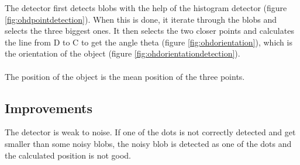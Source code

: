     The detector first detects blobs with the help of the histogram 
    detector (figure \ref{fig:ohdpointdetection}). When this is done, it 
    iterate through the blobs and selects 
    the three biggest ones.  It then selects the two closer points and 
    calculates the line from D to C to get the angle theta (figure
    \ref{fig:ohdorientation}), which is the 
    orientation of the object (figure \ref{fig:ohdorientationdetection}).
    \\
    \\
    The position of the object is the mean position of the three points.

\subsection{Improvements}
\label{sec:ohd:improvments}

    The detector is weak to noise. If one of the dots is not correctly 
    detected and get smaller than some noisy blobs, the noisy blob is 
    detected as one of the dots and the calculated position is not 
    good.


